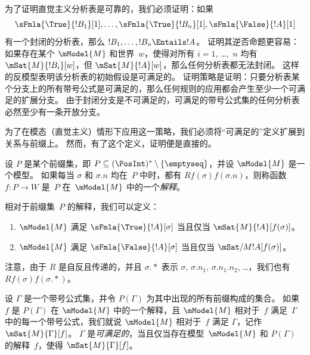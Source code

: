 \documentclass[../../../include/open-logic-section]{subfiles}
\begin{document}


\begin{explain}
  为了证明直觉主义分析表是可靠的，我们必须证明：如果
  \[
  \sFmla{\True}{!B_1}[1], \dots, \sFmla{\True}{!B_n}[1], \sFmla{\False}{!A}[1]
  \]
  有一个封闭的分析表，那么 $!B_1, \dots, !B_n \Entails !A$。
  证明其逆否命题更容易：如果存在某个 $\mModel{M}$ 和世界~$w$，使得对所有 $i=1$, \dots,~$n$ 均有 $\mSat{M}{!B_i}[w]$，但 $\mSat{M}{!A}[w]$，那么任何分析表都无法封闭。
  这样的反模型表明该分析表的初始假设是可满足的。
  证明策略是证明：只要分析表某个分支上的所有带号公式是可满足的，那么任何规则的应用都会产生至少一个可满足的扩展分支。
  由于封闭分支是不可满足的，可满足的带号公式集的任何分析表必然至少有一条开放分支。

  为了在模态（直觉主义）情形下应用这一策略，我们必须将“可满足的”定义扩展到关系与前缀上。
  然而，有了这个定义，证明便是直接的。
\end{explain}

\begin{defn}
  设 $P$ 是某个前缀集，即 $P \subseteq (\PosInt)^*
  \setminus \{\emptyseq\}$，并设 $\mModel{M}$ 是一个模型。
  如果每当 $\sigma$ 和 $\sigma.n$ 均在~$P$ 中时，都有 $Rf(\sigma)f(\sigma.n)$，则称函数~$f\colon P \to W$ 是~$P$ 在~$\mModel{M}$ 中的一个\emph{解释}。

  相对于前缀集~$P$ 的解释，我们可以定义：
  \begin{enumerate}
  \item $\mModel{M}$ 满足 $\sFmla{\True}{!A}[\sigma]$ 当且仅当
    $\mSat{M}{!A}[f(\sigma)]$。
  \item $\mModel{M}$ 满足 $\sFmla{\False}{!A}[\sigma]$ 当且仅当
    $\mSat/{M}{!A}[f(\sigma)]$。
  \end{enumerate}
\end{defn}

注意，由于 $R$ 是自反且传递的，并且 $\sigma.{*}$ 表示 $\sigma$, $\sigma.n_1$, $\sigma.n_1.n_2$, \dots，我们也有 $Rf(\sigma)f(\sigma.{*})$。

\begin{defn}
  设 $\Gamma$ 是一个带号公式集，并令 $P(\Gamma)$ 为其中出现的所有前缀构成的集合。
  如果 $f$ 是 $P(\Gamma)$ 在 $\mModel{M}$ 中的一个解释，且 $\mModel{M}$ 相对于~$f$ 满足~$\Gamma$ 中的每一个带号公式，我们就说 $\mModel{M}$ 相对于~$f$ 满足 $\Gamma$，记作 $\mSat{M}{\Gamma}[f]$。
  $\Gamma$ 是\emph{可满足的}，当且仅当存在模型~$\mModel{M}$ 和 $P(\Gamma)$ 的解释~$f$，使得 $\mSat{M}{\Gamma}[f]$。
\end{defn}
\end{document}
